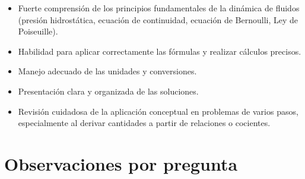\documentclass[11pt,a4paper]{article}
\begin{document}
\vspace{4pt}
\begin{minipage}[t]{0.48\linewidth}
  \begin{tcolorbox}[cajaFortaleza, title={Fortalezas}]
\begin{itemize}[leftmargin=1.5em, itemsep=2pt]
  \item Fuerte comprensión de los principios fundamentales de la dinámica de fluidos (presión hidrostática, ecuación de continuidad, ecuación de Bernoulli, Ley de Poiseuille).
  \item Habilidad para aplicar correctamente las fórmulas y realizar cálculos precisos.
  \item Manejo adecuado de las unidades y conversiones.
  \item Presentación clara y organizada de las soluciones.
\end{itemize}
  \end{tcolorbox}
\end{minipage}
\hfill
\begin{minipage}[t]{0.48\linewidth}
  \begin{tcolorbox}[cajaMejora, title={Areas de mejora}]
\begin{itemize}[leftmargin=1.5em, itemsep=2pt]
  \item Revisión cuidadosa de la aplicación conceptual en problemas de varios pasos, especialmente al derivar cantidades a partir de relaciones o cocientes.
\end{itemize}
  \end{tcolorbox}
\end{minipage}

\section*{Observaciones por pregunta}
\end{document}
